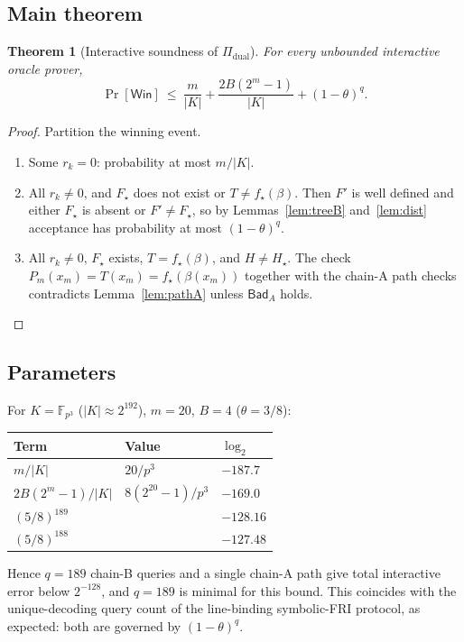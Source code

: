 \documentclass[11pt]{article}
\newtheorem{theorem}{Theorem}[section]
\theoremstyle{definition}
\newcommand{\F}{\mathbb{F}}
\newcommand{\K}{K}
\newcommand{\Bad}{\mathsf{Bad}}
\newcommand{\Win}{\mathsf{Win}}
\begin{document}
\subsection{Main theorem}

\begin{theorem}[Interactive soundness of $\Pi_{\mathrm{dual}}$]\label{thm:main}
For every unbounded interactive oracle prover,
\[
\Pr[\Win]\ \le\ \frac{m}{|\K|}+\frac{2B(2^m-1)}{|\K|}+(1-\theta)^q .
\]
\end{theorem}
\begin{proof}
Partition the winning event.
\begin{enumerate}[label=(\arabic*)]
\item Some $r_k=0$: probability at most $m/|\K|$.
\item All $r_k\ne0$, and $F_\star$ does not exist or $T\ne f_\star(\beta)$. Then $F'$ is well defined and either $F_\star$ is absent or $F'\ne F_\star$, so by Lemmas~\ref{lem:treeB} and~\ref{lem:dist} acceptance has probability at most $(1-\theta)^q$.
\item All $r_k\ne0$, $F_\star$ exists, $T=f_\star(\beta)$, and $H\ne H_\star$. The check $P_m(x_m)=T(x_m)=f_\star(\beta(x_m))$ together with the chain-A path checks contradicts Lemma~\ref{lem:pathA} unless $\Bad_A$ holds.\qedhere
\end{enumerate}
\end{proof}

\subsection{Parameters}

For $\K=\F_{p^3}$ ($|\K|\approx2^{192}$), $m=20$, $B=4$ ($\theta=3/8$):

\begin{center}
\begin{tabular}{@{}lll@{}}
\toprule
Term & Value & $\log_2$ \\
\midrule
$m/|\K|$ & $20/p^3$ & $-187.7$ \\
$2B(2^m-1)/|\K|$ & $8(2^{20}-1)/p^3$ & $-169.0$ \\
$(5/8)^{189}$ & & $-128.16$ \\
$(5/8)^{188}$ & & $-127.48$ \\
\bottomrule
\end{tabular}
\end{center}

Hence $q=189$ chain-B queries and a single chain-A path give total interactive error below $2^{-128}$, and $q=189$ is minimal for this bound. This coincides with the unique-decoding query count of the line-binding symbolic-FRI protocol, as expected: both are governed by $(1-\theta)^q$.
\end{document}
